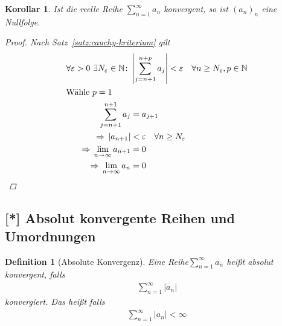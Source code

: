 \documentclass[11pt, twoside, a4paper]{article}
\theoremstyle{plain}
\newtheorem{definition}[blockelement]{Definition}
\newtheorem{korollar}[blockelement]{Korollar}
\newcommand{\abs}[1]{\left\lvert#1\right\rvert}
\newcommand{\impl}[0]{\Rightarrow{}}
\newcommand{\fromto}{\rightarrow{}}
\newcommand{\ntoinf}[0]{n\fromto\infty}
\newcommand{\N}{\mathbb{N}}
\begin{document}
    \begin{korollar} %
        \label{korollar:folge-von-reihe-nullfolge}
        Ist die reelle Reihe $\sum_{n=1}^{\infty} a_n$ konvergent, so ist $(a_n)_n$ eine Nullfolge.
        \begin{proof}
            Nach Satz~\ref{satz:cauchy-kriterium} gilt
            \begin{align*}
                \forall \varepsilon > 0~\exists N_{\varepsilon}\in\N\colon &\abs{\sum_{j=n+1}^{n+p} a_j} < \varepsilon\quad\forall n\geq N_{\varepsilon}, p\in\N\\
                \intertext{Wähle $p=1$}
                \sum_{j=n+1}^{n+1} a_{j} &= a_{j+1}\\
                \impl \abs{a_{n+1}} &< \varepsilon\quad \forall n\geq N_{\varepsilon}\\
                \impl \lim_{\ntoinf} a_{n+1} &= 0\\
                \impl \lim_{\ntoinf} a_{n} &= 0\qedhere
            \end{align*}
        \end{proof}
    \end{korollar}

    \newpage

    \subsection{[*] Absolut konvergente Reihen und Umordnungen}

    \begin{definition}[Absolute Konvergenz] %
        Eine Reihe$\sum_{n=1}^{\infty} a_n$ heißt absolut konvergent, falls
        \begin{align*}
            \sum_{n=1}^{\infty} \abs{a_n}
        \end{align*}
        konvergiert. Das heißt falls
        \begin{align*}
            \sum_{n=1}^{\infty} \abs{a_n} < \infty
        \end{align*}
    \end{definition}
\end{document}
